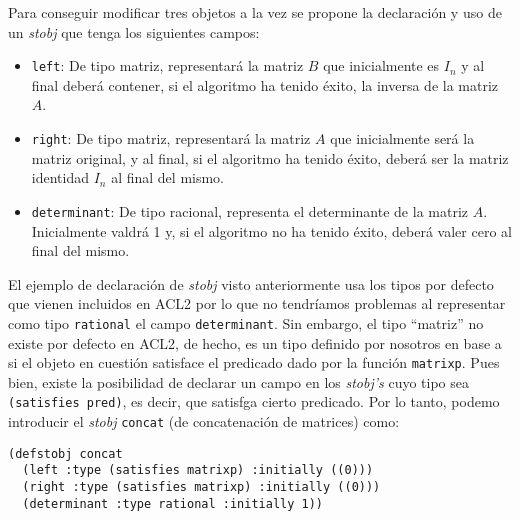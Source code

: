\documentclass[a4paper,10pt]{article}
\begin{document}
Para conseguir modificar tres objetos a la vez se propone la declaración y uso de un \emph{stobj} que tenga los siguientes campos:

\par \vspace{10pt}

\begin{itemize}
	\item \texttt{left}: De tipo matriz, representará la matriz $B$ que inicialmente es $I_n$ y al final deberá contener, si el algoritmo ha tenido éxito, la inversa de la matriz $A$.
	\item \texttt{right}: De tipo matriz, representará la matriz $A$ que inicialmente será la matriz original, y al final, si el algoritmo ha tenido éxito, deberá ser la matriz identidad $I_n$ al final del mismo.
	\item \texttt{determinant}: De tipo racional, representa el determinante de la matriz $A$. Inicialmente valdrá 1 y, si el algoritmo no ha tenido éxito, deberá valer cero al final del mismo. 
\end{itemize}

\par \vspace{10pt}

El ejemplo de declaración de \emph{stobj} visto anteriormente usa los tipos por defecto que vienen incluidos en ACL2 por lo que no tendríamos problemas al representar como tipo \texttt{rational} el campo \texttt{determinant}. Sin embargo, el tipo ``matriz'' no existe por defecto en ACL2, de hecho, es un tipo definido por nosotros en base a si el objeto en cuestión satisface el predicado dado por la función \texttt{matrixp}. Pues bien, existe la posibilidad de declarar un campo en los \emph{stobj's} cuyo tipo sea \texttt{(satisfies pred)}, es decir, que satisfga cierto predicado. Por lo tanto, podemo introducir el \emph{stobj} \texttt{concat} (de concatenación de matrices) como:

\par \vspace{10pt}

\begin{lstlisting}[language=clips]
(defstobj concat
  (left :type (satisfies matrixp) :initially ((0)))
  (right :type (satisfies matrixp) :initially ((0)))
  (determinant :type rational :initially 1))
\end{lstlisting}

\par \vspace{10pt}
\end{document}
